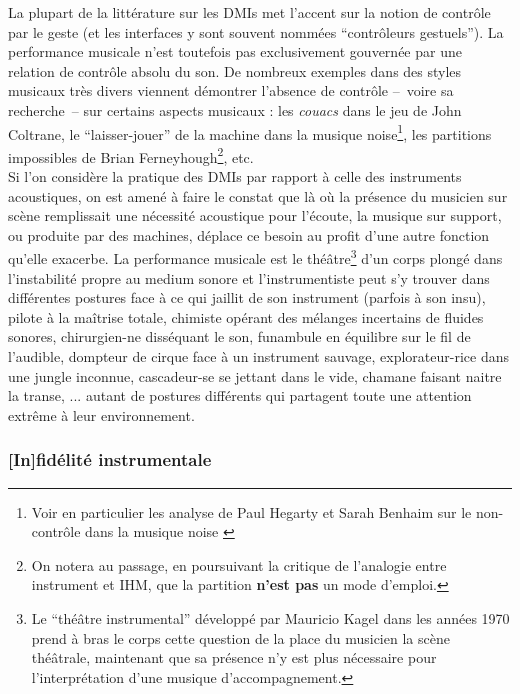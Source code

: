 \noindent La plupart de la littérature sur les \glspl{DMI} met l'accent sur la notion de contrôle par le geste (et les interfaces y sont souvent nommées ``contrôleurs gestuels''). La performance musicale n'est toutefois pas exclusivement gouvernée par une relation de contrôle absolu du son. De nombreux exemples dans des styles musicaux très divers viennent démontrer l'absence de contrôle --~voire sa recherche~-- sur certains aspects musicaux : les \textit{couacs} dans le jeu de John Coltrane, le ``laisser-jouer'' de la machine dans la musique noise\footnote{Voir en particulier les analyse de Paul Hegarty et Sarah Benhaim sur le non-contrôle dans la musique noise \cite{hegarty_noise_2007, benhaim_aux_2018}}, les partitions impossibles de Brian Ferneyhough\footnote{On notera au passage, en poursuivant la critique de l'analogie entre instrument et \gls{IHM}, que la partition \textbf{n'est pas} un mode d'emploi.}, etc.\\
\indent Si l'on considère la pratique des \glspl{DMI} par rapport à celle des instruments acoustiques, on est amené à faire le constat que là où la présence du musicien sur scène remplissait une nécessité acoustique pour l’écoute, la musique sur support, ou produite par des machines, déplace ce besoin au profit d’une autre fonction qu'elle exacerbe. La performance musicale est le théâtre\footnote{Le ``théâtre instrumental'' développé par Mauricio Kagel dans les années 1970 prend à bras le corps cette question de la place du musicien la scène théâtrale, maintenant que sa présence n'y est plus nécessaire pour l'interprétation d'une musique d'accompagnement.} d'un corps plongé dans l'instabilité propre au medium sonore et l'instrumentiste peut s'y trouver dans différentes postures face à ce qui jaillit de son instrument (parfois à son insu), pilote à la maîtrise totale, chimiste opérant des mélanges incertains de fluides sonores, chirurgien-ne disséquant le son, funambule en équilibre sur le fil de l'audible, dompteur de cirque face à un instrument sauvage, explorateur-rice dans une jungle inconnue, cascadeur-se se jettant dans le vide, chamane faisant naitre la transe, ... autant de postures différents qui partagent toute une attention extrême à leur environnement.

\subsubsection{[In]fidélité instrumentale}

